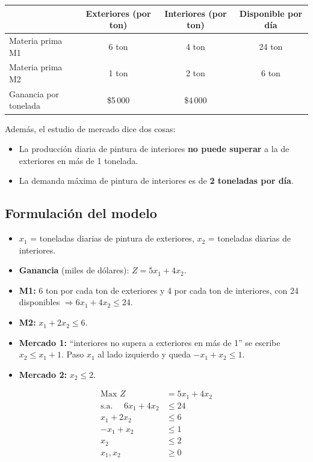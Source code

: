 \documentclass[11pt,a4paper]{article}
\begin{document}
\begin{center}
\begin{tabular}{lccc}
\toprule
 & \textbf{Exteriores} (por ton) & \textbf{Interiores} (por ton) & \textbf{Disponible por día} \\
\midrule
Materia prima M1 & 6 ton & 4 ton & 24 ton \\
Materia prima M2 & 1 ton & 2 ton & 6 ton \\
\midrule
Ganancia por tonelada & \$5\,000 & \$4\,000 & \\
\bottomrule
\end{tabular}
\end{center}

Además, el estudio de mercado dice dos cosas:
\begin{itemize}[itemsep=2pt]
  \item La producción diaria de pintura de interiores \textbf{no puede superar} a la de exteriores en más de 1 tonelada.
  \item La demanda máxima de pintura de interiores es de \textbf{2 toneladas por día}.
\end{itemize}

\subsection*{Formulación del modelo}
\begin{itemize}[itemsep=2pt]
  \item $x_1$ = toneladas diarias de pintura de exteriores, \quad $x_2$ = toneladas diarias de interiores.
  \item \textbf{Ganancia} (miles de dólares): $Z = 5x_1 + 4x_2$.
  \item \textbf{M1:} 6 ton por cada ton de exteriores y 4 por cada ton de interiores, con 24 disponibles
        $\Rightarrow 6x_1 + 4x_2 \le 24$.
  \item \textbf{M2:} $x_1 + 2x_2 \le 6$.
  \item \textbf{Mercado 1:} ``interiores no supera a exteriores en más de 1'' se escribe $x_2 \le x_1 + 1$.
        Paso $x_1$ al lado izquierdo y queda $-x_1 + x_2 \le 1$.
  \item \textbf{Mercado 2:} $x_2 \le 2$.
\end{itemize}

\[
\begin{aligned}
\text{Max } Z &= 5x_1 + 4x_2\\
\text{s.a. } \quad 6x_1 + 4x_2 &\le 24\\
x_1 + 2x_2 &\le 6\\
-x_1 + x_2 &\le 1\\
x_2 &\le 2\\
x_1, x_2 &\ge 0
\end{aligned}
\]
\end{document}
